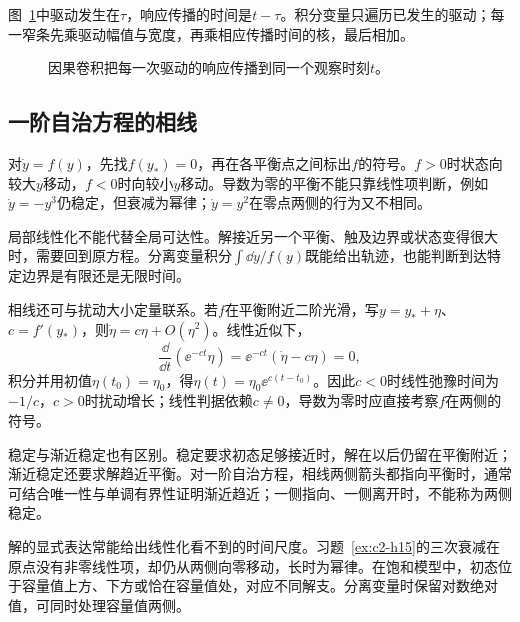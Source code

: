 图~\ref{fig:c2-causal-superposition}中驱动发生在$\tau$，响应传播的时间是$t-\tau$。积分变量只遍历已发生的驱动；每一窄条先乘驱动幅值与宽度，再乘相应传播时间的核，最后相加。
\begin{figure}[H]\centering
{}
\caption{因果卷积把每一次驱动的响应传播到同一个观察时刻$t$。}\label{fig:c2-causal-superposition}
\end{figure}

\subsection{一阶自治方程的相线}
对$\dot y=f(y)$，先找$f(y_*)=0$，再在各平衡点之间标出$f$的符号。$f>0$时状态向较大$y$移动，$f<0$时向较小$y$移动。导数为零的平衡不能只靠线性项判断，例如$\dot y=-y^3$仍稳定，但衰减为幂律；$\dot y=y^2$在零点两侧的行为又不相同。

局部线性化不能代替全局可达性。解接近另一个平衡、触及边界或状态变得很大时，需要回到原方程。分离变量积分$\int\dd y/f(y)$既能给出轨迹，也能判断到达特定边界是有限还是无限时间。

相线还可与扰动大小定量联系。若$f$在平衡附近二阶光滑，写$y=y_*+\eta$、$c=f'(y_*)$，则$\dot\eta=c\eta+O(\eta^2)$。线性近似下，
\[\frac{\dd}{\dd t}(\ee^{-ct}\eta)=\ee^{-ct}(\dot\eta-c\eta)=0,\]
积分并用初值$\eta(t_0)=\eta_0$，得$\eta(t)=\eta_0\ee^{c(t-t_0)}$。因此$c<0$时线性弛豫时间为$-1/c$，$c>0$时扰动增长；线性判据依赖$c\ne0$，导数为零时应直接考察$f$在两侧的符号。

稳定与渐近稳定也有区别。稳定要求初态足够接近时，解在以后仍留在平衡附近；渐近稳定还要求解趋近平衡。对一阶自治方程，相线两侧箭头都指向平衡时，通常可结合唯一性与单调有界性证明渐近趋近；一侧指向、一侧离开时，不能称为两侧稳定。

解的显式表达常能给出线性化看不到的时间尺度。习题~\ref{ex:c2-h15}的三次衰减在原点没有非零线性项，却仍从两侧向零移动，长时为幂律。在饱和模型中，初态位于容量值上方、下方或恰在容量值处，对应不同解支。分离变量时保留对数绝对值，可同时处理容量值两侧。

